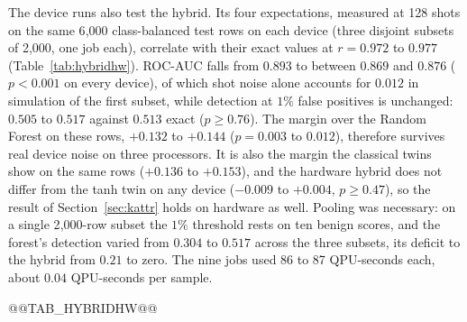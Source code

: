 The device runs also test the hybrid. Its four expectations, measured at 128 shots on the same 6{,}000
class-balanced test rows on each device (three disjoint subsets of 2{,}000, one job each), correlate with
their exact values at $r=0.972$ to $0.977$ (Table~\ref{tab:hybridhw}). ROC-AUC falls from $0.893$ to
between $0.869$ and $0.876$ ($p<0.001$ on every device), of which shot noise alone accounts for $0.012$ in
simulation of the first subset, while detection at $1\%$ false positives is unchanged: $0.505$ to $0.517$
against $0.513$ exact ($p\ge0.76$). The margin over the Random Forest on these rows, $+0.132$ to $+0.144$
($p=0.003$ to $0.012$), therefore survives real device noise on three processors. It is also the margin
the classical twins show on the same rows ($+0.136$ to $+0.153$), and the hardware hybrid does not differ
from the tanh twin on any device ($-0.009$ to $+0.004$, $p\ge0.47$), so the result of
Section~\ref{sec:kattr} holds on hardware as well. Pooling was necessary: on a single 2{,}000-row subset
the $1\%$ threshold rests on ten benign scores, and the forest's detection varied from $0.304$ to $0.517$
across the three subsets, its deficit to the hybrid from $0.21$ to zero. The nine jobs used 86 to 87
QPU-seconds each, about $0.04$ QPU-seconds per sample.

@@TAB_HYBRIDHW@@
